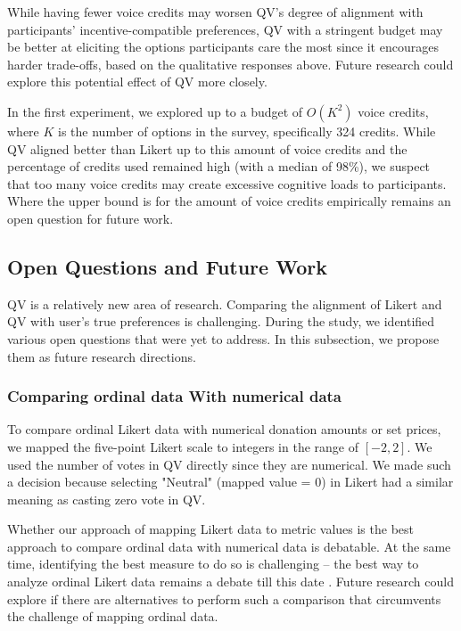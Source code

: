 While having fewer voice credits may worsen QV's degree of alignment with participants' incentive-compatible preferences, QV with a stringent budget may be better at eliciting the options participants care the most since it encourages harder trade-offs, based on the qualitative responses above. Future research could explore this potential effect of QV more closely.

In the first experiment, we explored up to a budget of $O(K^{2})$ voice credits, where $K$ is the number of options in the survey, specifically 324 credits. While QV aligned better than Likert up to this amount of voice credits and the percentage of credits used remained high (with a median of 98\%), we suspect that too many voice credits may create excessive cognitive loads to participants. Where the upper bound is for the amount of voice credits empirically remains an open question for future work.


\subsection{Open Questions and Future Work}
QV is a relatively new area of research. Comparing the alignment of Likert and QV with user's true preferences is challenging. During the study, we identified various open questions that were yet to address. In this subsection, we propose them as future research directions.

\subsubsection{Comparing ordinal data With numerical data}
To compare ordinal Likert data with numerical donation amounts or set prices, we mapped the five-point Likert scale to integers in the range of $[-2, 2]$. We used the number of votes in QV directly since they are numerical. We made such a decision because selecting "Neutral" (mapped value = 0) in Likert had a similar meaning as casting zero vote in QV.

Whether our approach of mapping Likert data to metric values is the best approach to compare ordinal data with numerical data is debatable. At the same time, identifying the best measure to do so is challenging -- the best way to analyze ordinal Likert data remains a debate till this date \cite{gob2007ordinal}. Future research could explore if there are alternatives to perform such a comparison that circumvents the challenge of mapping ordinal data. 

